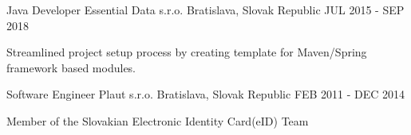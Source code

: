 \begin{cventries}
  \cventry
    {Java Developer} %
    {Essential Data s.r.o.} %
    {Bratislava, Slovak Republic} %
    {JUL 2015 - SEP 2018} %
    {
      \begin{cvitems} %
        \item {Streamlined project setup process by creating template for Maven/Spring framework based modules.}
      \end{cvitems}
    }

  \cventry
    {Software Engineer} %
    {Plaut s.r.o.} %
    {Bratislava, Slovak Republic} %
    {FEB 2011 - DEC 2014} %
    {
      \begin{cvitems} %
        \item {Member of the Slovakian Electronic Identity Card(eID) Team}
      \end{cvitems}
    }

\end{cventries}
